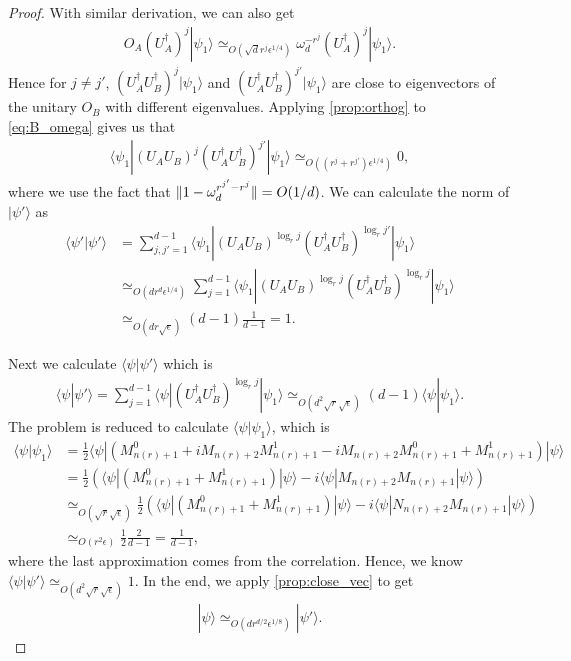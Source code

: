 \documentclass[11pt,letterpaper]{article}
\newcommand{\ket}[1]{|#1\rangle}
\newcommand{\bra}[1]{\langle#1|}
\newcommand{\braket}[2]{\langle#1|#2\rangle}
\newcommand{\ct}{^{\dagger}}
\DeclarePairedDelimiter{\norm}{\lVert}{\rVert}
\newcommand{\1}{\mathbb{1}}
\newcommand{\nr}{n(r)}
\newcommand{\ep}{\epsilon}
\newcommand{\se}{\sqrt{\epsilon}}
\newcommand{\qe}{\epsilon^{1/4}}
\newcommand{\sd}{\sqrt{d}}
\newcommand{\sr}{\sqrt{r}}
\newcommand{\appd}[1]{\simeq_{#1}}
\theoremstyle{definition}
\begin{document}
\begin{proof}
    With similar derivation, we can also get
    \begin{align}
    \label{eq:A_omega}
        O_A (U_A\ct)^j \ket{\psi_1} \appd{O(\sd r^{j} \qe)}\omega_d^{-r^j}  (U_A\ct)^j \ket{\psi_1}.
    \end{align}
	Hence for $j \neq j'$, $(U_A\ct U_B\ct)^{j} \ket{\psi_1}$ and $(U_A\ct U_B\ct)^{ j'} \ket{\psi_1}$ are close to eigenvectors
	of the unitary $O_B$ with different eigenvalues.
	Applying \cref{prop:orthog} to \cref{eq:B_omega} gives us that  
	\begin{align*}
		\bra{\psi_1} (U_AU_B)^{j} (U_A\ct U_B\ct)^{ j'} \ket{\psi_1} \appd{O( (r^j + r^{j'}) \qe)} 0,
	\end{align*}
	where we use the fact that $\norm{1 - \omega_d^{r^{j'}-r^j}} = O(1/d)$.
	We can calculate the norm of $\ket{\psi'}$ as 
	\begin{align*}
		\braket{\psi'}{\psi'} &=\sum_{j,j'=1}^{d-1} \bra{\psi_1} (U_AU_B)^{\log_r j} (U_A\ct U_B\ct)^{\log_r j'} \ket{\psi_1}\\
		&\appd{O(dr^{d} \qe)} \sum_{j=1}^{d-1} \bra{\psi_1} (U_AU_B)^{\log_r j} (U_A\ct U_B\ct)^{\log_r j} \ket{\psi_1}\\
		&\appd{O(dr\se)} (d-1) \frac{1}{d-1} = 1.
	\end{align*}
	
	Next we calculate $\braket{\psi}{\psi'}$ which is
	\begin{align*}
		\braket{\psi}{\psi'} = \sum_{j=1}^{d-1} \bra{\psi} (U_A\ct U_B\ct)^{\log_r j} \ket{\psi_1}
		 \appd{O(d^2\sr\se)} (d-1) \braket{\psi}{\psi_1}.
	\end{align*}
	The problem is reduced to calculate $\braket{\psi}{\psi_1}$, which is
	\begin{align*}
		\braket{\psi}{\psi_1} &= \frac{1}{2} \bra{\psi} (M_{\nr+1}^0 + iM_{\nr+2}M_{\nr+1}^1 - iM_{\nr+2}M_{\nr+1}^0 +M_{\nr+1}^1) \ket{\psi}\\
		& = \frac{1}{2} \left(\bra{\psi}(M_{\nr+1}^0 + M_{\nr+1}^1) \ket{\psi} - i \bra{\psi}M_{\nr+2}M_{\nr+1} \ket{\psi} \right)\\
		& \appd{O(\sr\se)} \frac{1}{2} \left(\bra{\psi}(M_{\nr+1}^0 + M_{\nr+1}^1) \ket{\psi}  - i \bra{\psi}N_{\nr+2}M_{\nr+1} \ket{\psi} \right)\\
		& \appd{O(r^2 \ep)} \frac{1}{2} \frac{2}{d-1} = \frac{1}{d-1},
	\end{align*}
	where the last approximation comes from the correlation.
	Hence, we know $\braket{\psi}{\psi'} \appd{O(d^2 \sr \se)} 1$.
	In the end, we apply \cref{prop:close_vec} to get
	\begin{align*}
		\ket{\psi} \appd{O(d r^{d/2} \ep^{1/8})} \ket{\psi'}.
	\end{align*}
\end{proof}
\end{document}
